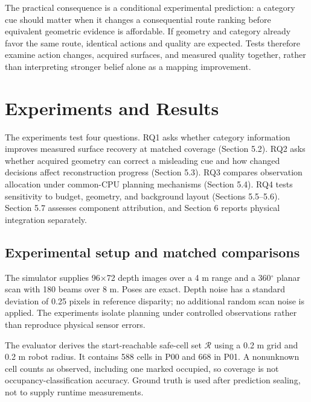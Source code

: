 \documentclass[11pt,a4paper]{article}
\providecommand{\hypertarget}[2]{#2}
\begin{document}
The practical consequence is a conditional experimental prediction: a category cue should matter when it changes a consequential route ranking before equivalent geometric evidence is affordable. If geometry and category already favor the same route, identical actions and quality are expected. Tests therefore examine action changes, acquired surfaces, and measured quality together, rather than interpreting stronger belief alone as a mapping improvement.

\hypertarget{experiments-and-results}{%
\section{Experiments and Results}\label{experiments-and-results}}

The experiments test four questions. RQ1 asks whether category information improves measured surface recovery at matched coverage (Section 5.2). RQ2 asks whether acquired geometry can correct a misleading cue and how changed decisions affect reconstruction progress (Section 5.3). RQ3 compares observation allocation under common-CPU planning mechanisms (Section 5.4). RQ4 tests sensitivity to budget, geometry, and background layout (Sections 5.5--5.6). Section 5.7 assesses component attribution, and Section 6 reports physical integration separately.

\hypertarget{experimental-setup-and-matched-comparisons}{%
\subsection{Experimental setup and matched comparisons}\label{experimental-setup-and-matched-comparisons}}

The simulator supplies 96\ensuremath{\times}72 depth images over a 4 m range and a 360\ensuremath{^{\circ}} planar scan with 180 beams over 8 m. Poses are exact. Depth noise has a standard deviation of 0.25 pixels in reference disparity; no additional random scan noise is applied. The experiments isolate planning under controlled observations rather than reproduce physical sensor errors.

The evaluator derives the start-reachable safe-cell set \(\mathcal R\) using a 0.2 m grid and 0.2 m robot radius. It contains 588 cells in P00 and 668 in P01. A nonunknown cell counts as observed, including one marked occupied, so coverage is not occupancy-classification accuracy. Ground truth is used after prediction sealing, not to supply runtime measurements.
\end{document}
